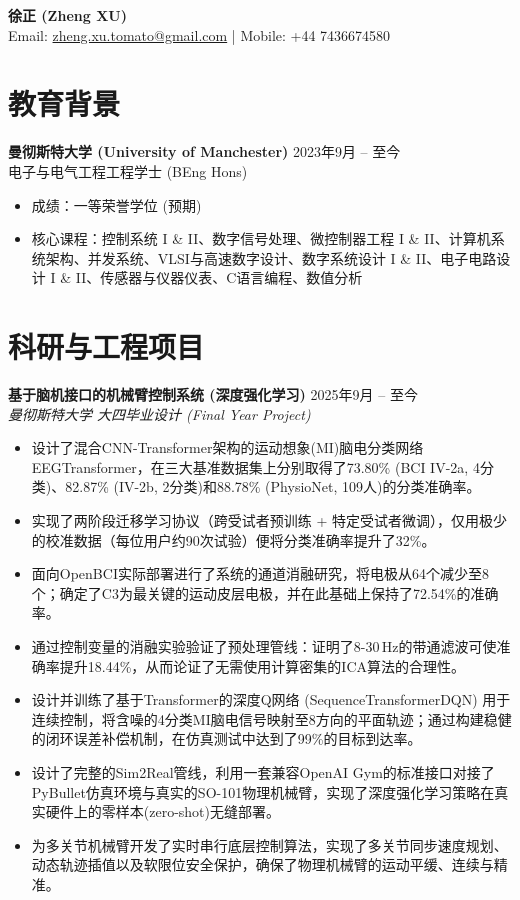 \documentclass[11pt, a4paper]{article}
\newcommand{\entry}[2]{\textbf{#1} \hfill #2}
\begin{document}
\begin{center}
    {\LARGE \textbf{徐正 (Zheng XU)}} \\[4pt]
    Email: \href{mailto:zheng.xu.tomato@gmail.com}{zheng.xu.tomato@gmail.com} \quad | \quad Mobile: +44 7436674580
\end{center}

\section{教育背景}

\entry{曼彻斯特大学 (University of Manchester)}{2023年9月 -- 至今} \\
电子与电气工程工程学士 (BEng Hons)
\begin{itemize}[leftmargin=*, nosep, topsep=2pt]
    \item 成绩：一等荣誉学位 (预期)
    \item 核心课程：控制系统 I \& II、数字信号处理、微控制器工程 I \& II、计算机系统架构、并发系统、VLSI与高速数字设计、数字系统设计 I \& II、电子电路设计 I \& II、传感器与仪器仪表、C语言编程、数值分析
\end{itemize}

\section{科研与工程项目}

\entry{基于脑机接口的机械臂控制系统 (深度强化学习)}{2025年9月 -- 至今} \\
\textit{曼彻斯特大学 大四毕业设计 (Final Year Project)}
\begin{itemize}[leftmargin=*, nosep, topsep=2pt]
    \item 设计了混合CNN-Transformer架构的运动想象(MI)脑电分类网络EEGTransformer，在三大基准数据集上分别取得了73.80\% (BCI IV-2a, 4分类)、82.87\% (IV-2b, 2分类)和88.78\% (PhysioNet, 109人)的分类准确率。
    \item 实现了两阶段迁移学习协议（跨受试者预训练 + 特定受试者微调），仅用极少的校准数据（每位用户约90次试验）便将分类准确率提升了32\%。
    \item 面向OpenBCI实际部署进行了系统的通道消融研究，将电极从64个减少至8个；确定了C3为最关键的运动皮层电极，并在此基础上保持了72.54\%的准确率。
    \item 通过控制变量的消融实验验证了预处理管线：证明了8-30\,Hz的带通滤波可使准确率提升18.44\%，从而论证了无需使用计算密集的ICA算法的合理性。
    \item 设计并训练了基于Transformer的深度Q网络 (SequenceTransformerDQN) 用于连续控制，将含噪的4分类MI脑电信号映射至8方向的平面轨迹；通过构建稳健的闭环误差补偿机制，在仿真测试中达到了99\%的目标到达率。
    \item 设计了完整的Sim2Real管线，利用一套兼容OpenAI Gym的标准接口对接了PyBullet仿真环境与真实的SO-101物理机械臂，实现了深度强化学习策略在真实硬件上的零样本(zero-shot)无缝部署。
    \item 为多关节机械臂开发了实时串行底层控制算法，实现了多关节同步速度规划、动态轨迹插值以及软限位安全保护，确保了物理机械臂的运动平缓、连续与精准。
\end{itemize}
\end{document}
